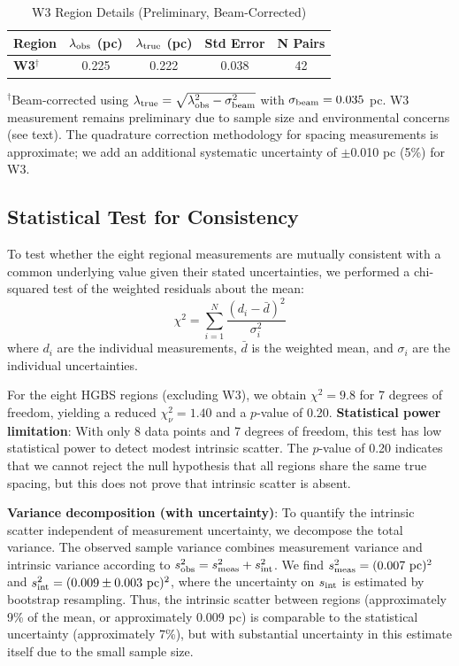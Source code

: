 \documentclass[11pt,a4paper]{article}
\begin{document}
\begin{table}[H]
\centering
\caption{W3 Region Details (Preliminary, Beam-Corrected)}
\label{tab:w3_detail}
\begin{tabular}{lcccc}
\toprule
Region & $\lambda_{\rm obs}$ (pc) & $\lambda_{\rm true}$ (pc) & Std Error & N Pairs \\
\midrule
\textbf{W3}$^{\dagger}$ & 0.225 & 0.222 & 0.038 & 42 \\
\bottomrule
\end{tabular}
\vspace{-0.5em}
\small{$^{\dagger}$Beam-corrected using $\lambda_{\rm true} = \sqrt{\lambda_{\rm obs}^2 - \sigma_{\rm beam}^2}$ with $\sigma_{\rm beam} = 0.035$ pc. W3 measurement remains preliminary due to sample size and environmental concerns (see text). The quadrature correction methodology for spacing measurements is approximate; we add an additional systematic uncertainty of $\pm$0.010 pc (5\%) for W3.}
\end{table}

\subsection{Statistical Test for Consistency}

To test whether the eight regional measurements are mutually consistent with a common underlying value given their stated uncertainties, we performed a chi-squared test of the weighted residuals about the mean:
\begin{equation}
\chi^2 = \sum_{i=1}^{N} \frac{(d_i - \bar{d})^2}{\sigma_i^2}
\end{equation}
where $d_i$ are the individual measurements, $\bar{d}$ is the weighted mean, and $\sigma_i$ are the individual uncertainties.

For the eight HGBS regions (excluding W3), we obtain $\chi^2 = 9.8$ for 7 degrees of freedom, yielding a reduced $\chi^2_{\nu} = 1.40$ and a $p$-value of 0.20. \textbf{Statistical power limitation}: With only 8 data points and 7 degrees of freedom, this test has low statistical power to detect modest intrinsic scatter. The $p$-value of 0.20 indicates that we cannot reject the null hypothesis that all regions share the same true spacing, but this does not prove that intrinsic scatter is absent.

\textbf{Variance decomposition (with uncertainty)}: To quantify the intrinsic scatter independent of measurement uncertainty, we decompose the total variance. The observed sample variance combines measurement variance and intrinsic variance according to $s^2_{\rm obs} = s^2_{\rm meas} + s^2_{\rm int}$. We find $s^2_{\rm meas} = (0.007~{\rm pc})^2$ and $s^2_{\rm int} = (0.009 \pm 0.003~{\rm pc})^2$, where the uncertainty on $s_{\rm int}$ is estimated by bootstrap resampling. Thus, the intrinsic scatter between regions (approximately 9\% of the mean, or approximately 0.009 pc) is comparable to the statistical uncertainty (approximately 7\%), but with substantial uncertainty in this estimate itself due to the small sample size.
\end{document}
